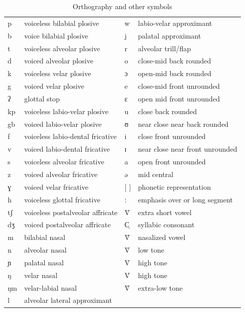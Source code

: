 \begin{table}[h]
  \caption{Orthography and other symbols\label{tab:orth-symb}}
\small
 \begin{tabular}{llll}
p & voiceless bilabial plosive & w&labio-velar approximant\\
b & voice bilabial plosive &j & palatal approximant \\
t & voiceless alveolar plosive &r & alveolar trill/flap\\
d &  voiced alveolar plosive&o& close-mid back rounded\\
k & voiceless velar plosive  &ɔ& open-mid back rounded\\
g & voiced velar plosive &e& close-mid front unrounded\\
ʔ & glottal stop &ɛ& open mid front unrounded\\
kp & voiceless labio-velar plosive &u& close back rounded\\
gb & voiced labio-velar plosive&ʊ& near close near back rounded\\
f & voiceless labio-dental fricative &i& close front unrounded\\
v & voiced labio-dental fricative  &ɪ& near close near front unrounded\\
s & voiceless alveolar fricative &a& open front unrounded\\
z & voiced alveolar fricative &ə& mid central\\
ɣ & voiced velar fricative&$[$ $]$ & phonetic representation\\
h & voiceless glottal fricative & ː & emphasis over or long segment\\
tʃ & voiceless postalveolar affricate & V̆ & extra short vowel\\
dʒ & voiced postalveolar affricate&C̩& syllabic consonant\\
m & bilabial nasal &  Ṽ & nasalized   vowel\\
n & alveolar nasal& V̀ & low tone \\
ɲ & palatal nasal &  V̄ & high tone \\
ŋ & velar nasal& V́ & high tone \\
ŋm & velar-labial nasal&V̏  & extra-low tone \\
l & alveolar lateral approximant  & &\\
\end{tabular}

 \end{table}
 
 


